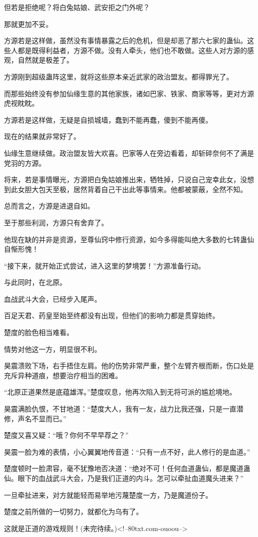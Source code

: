 \begin{this_body}
但若是拒绝呢？将白兔姑娘、武安拒之门外呢？

那就更加不妥。

方源若是这样做，虽然没有事情暴露之后的危机，但是却恶了那六七家的蛊仙。这些人都是既得利益者，方源不做。没有人牵头，他们也不敢做。这些人对方源的感观，自然就是极差了。

方源刚到超级蛊阵这里，就将这些原本亲近武家的政治盟友。都得罪光了。

而那些始终没有参加仙缘生意的其他家族，诸如巴家、铁家、商家等等，更对方源虎视眈眈。

方源若是这样做，无疑是自损城墙，蠢到不能再蠢，傻到不能再傻。

现在的结果就非常好了。

仙缘生意继续做。政治盟友皆大欢喜。巴家等人在旁边看着，却斩碎奈何不了满是党羽的方源。

将来，若是事情曝光，方源把白兔姑娘推出来，牺牲掉，只说自己宠幸此女，没想到此女胆大包天至极，居然背着自己干出此等事情来。他都被蒙蔽，全然不知。

总而言之，方源是进退自如。

至于那些利润，方源只有舍弃了。

他现在缺的并非是资源，至尊仙窍中修行资源，如今多得能叫绝大多数的七转蛊仙自惭形愧！

“接下来，就开始正式尝试，进入这里的梦境罢！”方源准备行动。

与此同时，在北原。

血战武斗大会，已经步入尾声。

百足天君、药皇至始至终都没有出现，但他们的影响力都是贯穿始终。

楚度的脸色相当难看。

情势对他这一方，明显很不利。

昊震溃败下场，右手捂住左肩。他的伤势非常严重，整个左臂齐根而断，伤口处是充斥异种道痕，想要治疗相当的困难。

“北原正道果然是底蕴雄浑。”楚度叹息，他再次陷入到无将可派的尴尬境地。

昊震满脸仇恨，不甘地道：“楚度大人，我有一友，战力比我还强，只是一直潜修，声名不显而已。”

楚度又喜又疑：“哦？你何不早早荐之？”

昊震一脸为难的表情，小心翼翼地传音道：“只有一点不好，此人修行的是血道。”

楚度顿时一脸肃容，毫不犹豫地否决道：“绝对不可！任何血道蛊仙，都是魔道蛊仙。眼下的血战武斗大会，乃是我们正道的内斗。怎可以牵扯血道魔头进来？”

一旦牵扯进来，对方就能轻而易举地污蔑楚度一方，乃是魔道份子。

楚度之前所做的一切努力，就都化为乌有了。

这就是正道的游戏规则！(未完待续。)<!--80txt.com-ouoou-->

\end{this_body}

